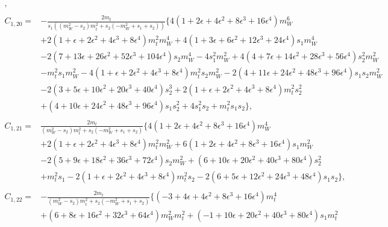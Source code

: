 \documentclass[twocolumn,aps,showpacs,nofootinbib,superscriptaddress,prd]{revtex4-2}
\begin{document}
\begin{widetext}
\begin{align}
,\nonumber\\
\nonumber\\
C_{1,20}=&-\frac{2m_t}{s_1\left(\left(m_W^2-s_2\right)m_t^2+s_2\left(-m_W^2+s_1+s_2\right)\right)}\{4\left(1 +2 \epsilon +4 \epsilon^2 +8 \epsilon^3 +16 \epsilon^4\right)m_W^6
\nonumber\\&
+2\left(1 +\epsilon +2 \epsilon^2 +4 \epsilon^3 +8 \epsilon^4\right)m_t^2m_W^4+4\left(1 +3 \epsilon +6 \epsilon^2 +12 \epsilon^3 +24 \epsilon^4\right)s_1m_W^4
\nonumber\\&
-2\left(7 +13 \epsilon +26 \epsilon^2 +52 \epsilon^3 +104 \epsilon^4\right)s_2m_W^4-4s_1^2m_W^2+4\left(4 +7 \epsilon +14 \epsilon^2 +28 \epsilon^3 +56 \epsilon^4\right)s_2^2m_W^2
\nonumber\\&
-m_t^2s_1m_W^2-4\left(1 +\epsilon +2 \epsilon^2 +4 \epsilon^3 +8 \epsilon^4\right)m_t^2s_2m_W^2-2\left(4 +11 \epsilon +24 \epsilon^2 +48 \epsilon^3 +96 \epsilon^4\right)s_1s_2m_W^2
\nonumber\\&
-2\left(3 +5 \epsilon +10 \epsilon^2 +20 \epsilon^3 +40 \epsilon^4\right)s_2^3+2\left(1 +\epsilon +2 \epsilon^2 +4 \epsilon^3 +8 \epsilon^4\right)m_t^2s_2^2
\nonumber\\&
+\left(4 +10 \epsilon +24 \epsilon^2 +48 \epsilon^3 +96 \epsilon^4\right)s_1s_2^2+4s_1^2s_2+m_t^2s_1s_2\}
,\nonumber\\
\nonumber\\
C_{1,21}=&\frac{2m_t}{\left(m_W^2-s_2\right)m_t^2+s_2\left(-m_W^2+s_1+s_2\right)}\{4\left(1 +2 \epsilon +4 \epsilon^2 +8 \epsilon^3 +16 \epsilon^4\right)m_W^4
\nonumber\\&
+2\left(1 +\epsilon +2 \epsilon^2 +4 \epsilon^3 +8 \epsilon^4\right)m_t^2m_W^2+6\left(1 +2 \epsilon +4 \epsilon^2 +8 \epsilon^3 +16 \epsilon^4\right)s_1m_W^2
\nonumber\\&
-2\left(5 +9 \epsilon +18 \epsilon^2 +36 \epsilon^3 +72 \epsilon^4\right)s_2m_W^2+\left(6 +10 \epsilon +20 \epsilon^2 +40 \epsilon^3 +80 \epsilon^4\right)s_2^2
\nonumber\\&
+m_t^2s_1-2\left(1 +\epsilon +2 \epsilon^2 +4 \epsilon^3 +8 \epsilon^4\right)m_t^2s_2-2\left(6 +5 \epsilon +12 \epsilon^2 +24 \epsilon^3 +48 \epsilon^4\right)s_1s_2\}
,\nonumber\\
\nonumber\\
C_{1,22}=&-\frac{2m_t}{\left(m_W^2-s_2\right)m_t^2+s_2\left(-m_W^2+s_1+s_2\right)}\{\left(-3 +4 \epsilon +4 \epsilon^2 +8 \epsilon^3 +16 \epsilon^4\right)m_t^4
\nonumber\\&
+\left(6 +8 \epsilon +16 \epsilon^2 +32 \epsilon^3 +64 \epsilon^4\right)m_W^2m_t^2+\left(-1 +10 \epsilon +20 \epsilon^2 +40 \epsilon^3 +80 \epsilon^4\right)s_1m_t^2

\end{align}
\end{widetext}
\end{document}
